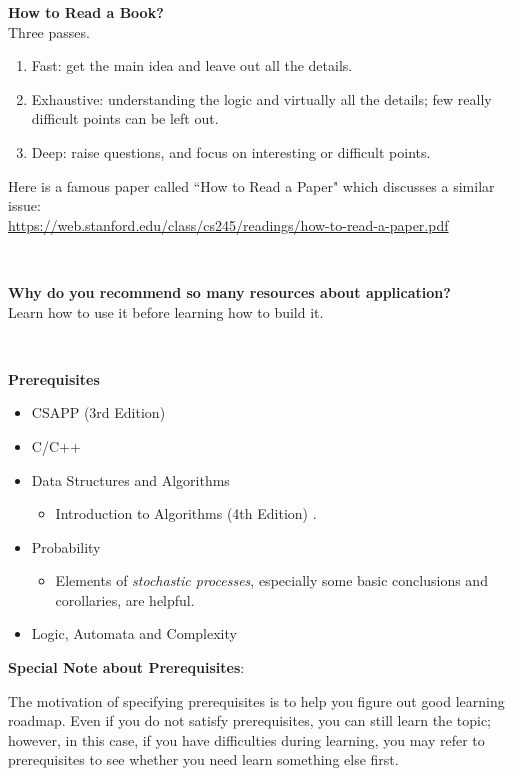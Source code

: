 \documentclass{article}
\begin{document}
\noindent
\textbf{How to Read a Book?}\\
Three passes.
\begin{enumerate}
    \item Fast: get the main idea and leave out all the details.
    \item Exhaustive: understanding the logic and virtually all the details; few really difficult points can be left out.
    \item Deep: raise questions, and focus on interesting or difficult points.
\end{enumerate}
Here is a famous paper called ``How to Read a Paper" which discusses a similar issue:\\
\href{https://web.stanford.edu/class/cs245/readings/how-to-read-a-paper.pdf}{https://web.stanford.edu/class/cs245/readings/how-to-read-a-paper.pdf}

~

\noindent
\textbf{Why do you recommend so many resources about application?}\\
Learn how to use it before learning how to build it.

~

\noindent
\textbf{Prerequisites}
\begin{itemize}
    \item CSAPP (3rd Edition) \cite{bryant2015computer}
    \item C/C++
    \item Data Structures and Algorithms
    \begin{itemize}
        \item Introduction to Algorithms (4th Edition) \cite{cormen2009introduction}.
    \end{itemize}
    \item Probability
    \begin{itemize}
        \item Elements of \emph{stochastic processes}, especially some basic conclusions and corollaries, are helpful.
    \end{itemize}
    \item Logic, Automata and Complexity
\end{itemize}

\noindent
\textbf{Special Note about Prerequisites}:

The motivation of specifying prerequisites is to help you figure out good learning roadmap.
Even if you do not satisfy prerequisites, you can still learn the topic; however, in this case, if you have difficulties during learning, you may refer to prerequisites to see whether you need learn something else first.
\end{document}
